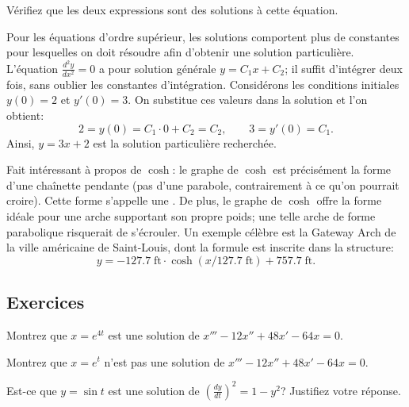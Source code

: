 \begin{exercise}
	Vérifiez que les deux expressions sont des solutions à cette équation.
\end{exercise}

\begin{example}
	Pour les équations d'ordre supérieur, les solutions comportent plus de constantes pour lesquelles 
	on doit résoudre afin d'obtenir une solution particulière.  
	L'équation  $\frac{d^2y}{dx^2} = 0$ a pour solution générale $y = C_1 x + C_2$; 
	il suffit d'intégrer deux fois, sans oublier les constantes d'intégration.  
	Considérons les conditions initiales $y(0) = 2$ et $y'(0) = 3$.  
	On substitue ces valeurs dans la solution et l'on obtient: 
	\begin{equation*}
		2 = y(0) = C_1 \cdot 0 + C_2 = C_2, \qquad
		3 = y'(0) = C_1 .
	\end{equation*}
	Ainsi, $y = 3x + 2$ est la solution particulière recherchée.
\end{example}

Fait intéressant à propos de $\cosh$:  le graphe de $\cosh$ est précisément la forme d'une 
chaînette pendante (pas d'une parabole, contrairement à ce qu'on pourrait croire).  
Cette forme s'appelle une \emph{}.
De plus, le graphe de $\cosh$ offre la forme idéale pour une arche supportant son propre poids; 
une telle arche de forme parabolique risquerait de s'écrouler.  
Un exemple célèbre est la  {Gateway Arch} de la ville 
américaine de Saint-Louis, dont la formule est inscrite dans la structure:
\begin{equation*}
	y = -127.7 \; \textrm{ft} \cdot \cosh\left( x /127.7  \; \textrm{ft} \right) + 757.7 \;\textrm{ft} .
\end{equation*}


\subsection{Exercices}

\begin{exercise}
	Montrez que $x = e^{4t}$ est une solution de $x'''-12 x'' + 48 x' - 64 x = 0$.
\end{exercise}

\begin{exercise}
	Montrez que $x = e^{t}$ n'est pas une solution de $x'''-12 x'' + 48 x' - 64 x = 0$.
\end{exercise}

\begin{exercise}
	Est-ce que $y = \sin t$ est une solution de ${\left( \frac{dy}{dt} \right)}^2 = 1 - y^2$?
	Justifiez votre réponse.
\end{exercise}

